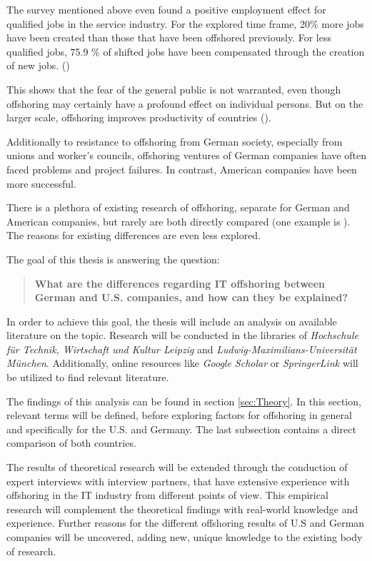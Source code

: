 The survey mentioned above even found a positive employment effect for qualified jobs in the service industry. For the explored time frame, 20\% more jobs have been created than those that have been offshored previously. For less qualified jobs, 75.9 \% of shifted jobs have been compensated through the creation of new jobs. (\cite[pp. 21f]{StatistischesBundesamt.2008})

This shows that the fear of the general public is not warranted, even though offshoring may certainly have a profound effect on individual persons. But on the larger scale, offshoring improves productivity of countries (\cite[pp. 90f]{Jahns.2007}).

Additionally to resistance to offshoring from German society, especially from unions and worker's councils, offshoring ventures of German companies have often faced  problems and project failures. In contrast, American companies have been more successful.

There is a plethora of existing research of offshoring, separate for German and American companies, but rarely are both directly compared (one example is \cite{Hutzschenreuter.2007}). The reasons for existing differences are even less explored.
\vspace{3mm}

The goal of this thesis is answering the question:

\begin{quote}
	\centering \textbf{What are the differences regarding IT offshoring between German and U.S. companies, and how can they be explained?}
\end{quote}
\vspace{3mm}

In order to achieve this goal, the thesis will include an analysis on available literature on the topic. Research will be conducted in the libraries of \textit{Hochschule für Technik, Wirtschaft und Kultur Leipzig} and \textit{Ludwig-Maximilians-Universität München}. Additionally, online resources like \textit{Google Scholar} or \textit{SpringerLink} will be utilized to find relevant literature. 

The findings of this analysis can be found in section \ref{sec:Theory}. In this section, relevant terms will be defined, before exploring factors for offshoring in general and specifically for the U.S. and Germany. The last subsection contains a direct comparison of both countries.

The results of theoretical research will be extended through the conduction of expert interviews with interview partners, that have extensive experience with offshoring in the IT industry from different points of view. This empirical research will complement the theoretical findings with real-world knowledge and experience. Further reasons for the different offshoring results of U.S and German companies will be uncovered, adding new, unique knowledge to the existing body of research.

